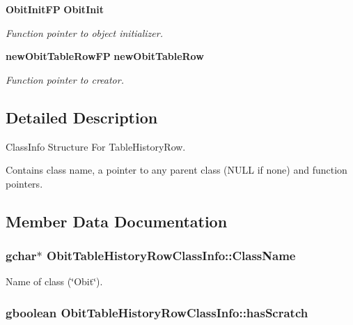\begin{CompactItemize}
{\bf Obit\-Init\-FP} {\bf Obit\-Init}
\begin{CompactList}\small\item\em Function pointer to object initializer. \item\end{CompactList}\item 
{\bf new\-Obit\-Table\-Row\-FP} {\bf new\-Obit\-Table\-Row}
\begin{CompactList}\small\item\em Function pointer to creator. \item\end{CompactList}\end{CompactItemize}


\subsection{Detailed Description}
Class\-Info Structure For Table\-History\-Row. 

Contains class name, a pointer to any parent class (NULL if none) and function pointers. 



\subsection{Member Data Documentation}
\subsubsection{\setlength{\rightskip}{0pt plus 5cm}gchar$\ast$ {\bf Obit\-Table\-History\-Row\-Class\-Info::Class\-Name}}\label{structObitTableHistoryRowClassInfo_o2}


Name of class (\char`\"{}Obit\char`\"{}). 

\subsubsection{\setlength{\rightskip}{0pt plus 5cm}gboolean {\bf Obit\-Table\-History\-Row\-Class\-Info::has\-Scratch}}\label{structObitTableHistoryRowClassInfo_o1}


